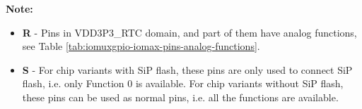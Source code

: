 \textbf{Note:}

\begin{itemize}
\item \textbf{R} - Pins in VDD3P3\_RTC domain, and part of them have analog functions, see Table \ref{tab:iomuxgpio-iomax-pins-analog-functions}.

\item \textbf{S} - For chip variants with SiP flash, these pins are only used to connect SiP flash, i.e. only Function 0 is available. For chip variants without SiP flash, these pins can be used as normal pins, i.e. all the functions are available.
\end{itemize}
